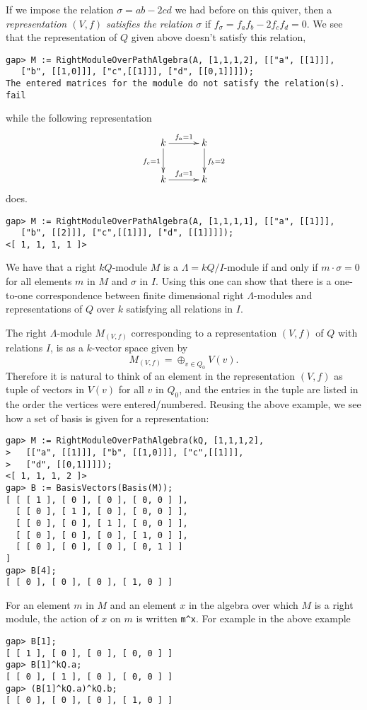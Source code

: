 \documentclass{amsart}
\renewcommand{\L}{\Lambda}
\theoremstyle{definition}
\theoremstyle{theoretic}
\begin{document}
If we impose the relation $\sigma = ab - 2cd$ we had before on this
quiver, then a \emph{representation $(V,f)$ satisfies the relation
  $\sigma$} if $f_\sigma = f_af_b - 2f_cf_d = 0$.  We see that the
representation of $Q$ given above doesn't satisfy this relation, 
\begin{verbatim}
gap> M := RightModuleOverPathAlgebra(A, [1,1,1,2], [["a", [[1]]], 
   ["b", [[1,0]]], ["c",[[1]]], ["d", [[0,1]]]]);
The entered matrices for the module do not satisfy the relation(s).
fail
\end{verbatim}
while the following representation  
\[\xymatrix@C=30pt{
k\ar[r]^{f_a = 1}\ar[d]_{f_c = 1} & k\ar[d]^{f_b = 2}\\
k\ar[r]^{f_d = 1} & k
}\]
does.
\begin{verbatim}
gap> M := RightModuleOverPathAlgebra(A, [1,1,1,1], [["a", [[1]]], 
   ["b", [[2]]], ["c",[[1]]], ["d", [[1]]]]);    
<[ 1, 1, 1, 1 ]>
\end{verbatim}  
We have that a right $kQ$-module $M$ is a $\L=kQ/I$-module if
and only if $m\cdot\sigma = 0$ for all elements $m$ in $M$ and
$\sigma$ in $I$.  Using this one can show that there is a one-to-one
correspondence between finite dimensional right $\L$-modules and
representations of $Q$ over $k$ satisfying all relations in $I$.  

The right $\L$-module $M_{(V,f)}$ corresponding to a representation
$(V,f)$ of $Q$ with relations $I$, is as a $k$-vector space given by 
\[M_{(V,f)} = \oplus_{v\in Q_0} V(v).\]
Therefore it is natural to think of an element in the representation
$(V,f)$ as tuple of vectors in $V(v)$ for all $v$ in $Q_0$, and the
entries in the tuple are listed in the order the vertices were
entered/numbered.  Reusing the above example, we see how a set of
basis is given for a representation: 
\begin{verbatim}
gap> M := RightModuleOverPathAlgebra(kQ, [1,1,1,2], 
>   [["a", [[1]]], ["b", [[1,0]]], ["c",[[1]]], 
>   ["d", [[0,1]]]]);
<[ 1, 1, 1, 2 ]>
gap> B := BasisVectors(Basis(M));
[ [ [ 1 ], [ 0 ], [ 0 ], [ 0, 0 ] ], 
  [ [ 0 ], [ 1 ], [ 0 ], [ 0, 0 ] ], 
  [ [ 0 ], [ 0 ], [ 1 ], [ 0, 0 ] ], 
  [ [ 0 ], [ 0 ], [ 0 ], [ 1, 0 ] ], 
  [ [ 0 ], [ 0 ], [ 0 ], [ 0, 1 ] ]
]
gap> B[4];
[ [ 0 ], [ 0 ], [ 0 ], [ 1, 0 ] ]
\end{verbatim}
For an element $m$ in $M$ and an element $x$ in the algebra over which
$M$ is a right module, the action of $x$ on $m$ is written \verb|m^x|.
For example in the above example
\begin{verbatim}
gap> B[1];     
[ [ 1 ], [ 0 ], [ 0 ], [ 0, 0 ] ]
gap> B[1]^kQ.a;
[ [ 0 ], [ 1 ], [ 0 ], [ 0, 0 ] ]
gap> (B[1]^kQ.a)^kQ.b;
[ [ 0 ], [ 0 ], [ 0 ], [ 1, 0 ] ]
\end{verbatim}
\end{document}

